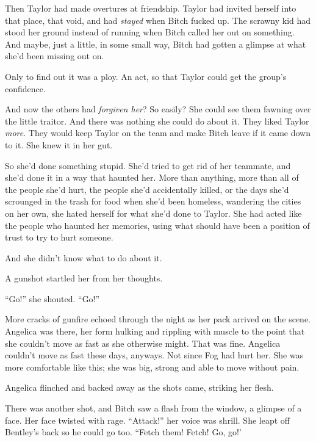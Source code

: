 Then Taylor had made overtures at friendship.  Taylor had invited herself into that place, that void, and had \emph{stayed} when Bitch fucked up.  The scrawny kid had stood her ground instead of running when Bitch called her out on something.  And maybe, just a little, in some small way, Bitch had gotten a glimpse at what she'd been missing out on.



Only to find out it was a ploy.  An act, so that Taylor could get the group's confidence.



And now the others had \emph{forgiven her}?  So easily?  She could see them fawning over the little traitor.  And there was nothing she could do about it.  They liked Taylor \emph{more}.  They would keep Taylor on the team and make Bitch leave if it came down to it.  She knew it in her gut.



So she'd done something stupid.  She'd tried to get rid of her teammate, and she'd done it in a way that haunted her.  More than anything, more than all of the people she'd hurt, the people she'd accidentally killed, or the days she'd scrounged in the trash for food when she'd been homeless, wandering the cities on her own, she hated herself for what she'd done to Taylor.  She had acted like the people who haunted her memories, using what should have been a position of trust to try to hurt someone.



And she didn't know what to do about it.



A gunshot startled her from her thoughts.



``Go!'' she shouted.  ``Go!''



More cracks of gunfire echoed through the night as her pack arrived on the scene.  Angelica was there, her form hulking and rippling with muscle to the point that she couldn't move as fast as she otherwise might.  That was fine.  Angelica couldn't move as fast these days, anyways.  Not since Fog had hurt her.  She was more comfortable like this; she was big, strong and able to move without pain.



Angelica flinched and backed away as the shots came, striking her flesh.



There was another shot, and Bitch saw a flash from the window, a glimpse of a face.  Her face twisted with rage.  ``Attack!''  her voice was shrill.  She leapt off Bentley's back so he could go too.  ``Fetch them!  Fetch!  Go, go!'




